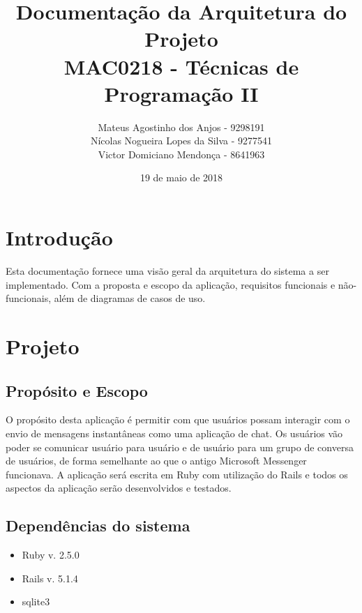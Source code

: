 \documentclass[11pt,a4paper,titlepage]{article}
\title{Documentação da Arquitetura do Projeto \\
MAC0218 - Técnicas de Programação II}
\author{Mateus Agostinho dos Anjos - 9298191\\Nícolas Nogueira Lopes da Silva - 9277541\\Victor Domiciano Mendonça - 8641963}
\date{19 de maio de 2018}
\begin{document}
\maketitle

\tableofcontents

\pagebreak

\section{Introdução}
Esta documentação fornece uma visão geral da arquitetura do sistema a ser implementado. Com a proposta e escopo da aplicação, requisitos funcionais e não-funcionais, além de diagramas de casos de uso.

\section{Projeto}
\subsection{Propósito e Escopo}
O propósito desta aplicação é permitir com que usuários possam interagir com o envio de mensagens instantâneas como uma aplicação de chat. Os usuários vão poder se comunicar usuário para usuário e de usuário para um grupo de conversa de usuários, de forma semelhante ao que o antigo Microsoft Messenger funcionava. A aplicação será escrita em Ruby com utilização do Rails e todos os aspectos da aplicação serão desenvolvidos e testados.
\subsection{Dependências do sistema}
\begin{itemize}
\item Ruby v. 2.5.0
\item Rails v. 5.1.4
\item sqlite3
\end{itemize}
\end{document}
